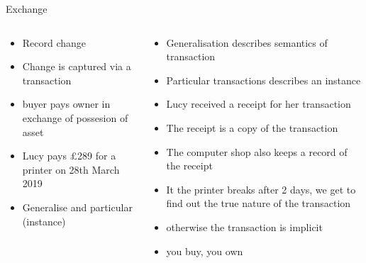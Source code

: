 \documentclass[pdf,table]{beamer}
\begin{document}
\begin{frame}{Exchange}
	\begin{columns}[T]
		\begin{column}{0.48\textwidth}
			\begin{itemize}
				\item Record change
				\item Change is captured via a transaction
				\item buyer pays owner in exchange of possesion of asset
				\item Lucy pays \pounds 289 for a printer on 28th March 2019
				\item Generalise and particular (instance)

			\end{itemize}
		\end{column}
		\begin{column}{0.48\textwidth}
			\begin{itemize}
				\item Generalisation describes semantics of transaction
				\item Particular transactions describes an instance
				\item Lucy received a receipt for her transaction
				\item The receipt is a copy of the transaction
				\item The computer shop also keeps a record of the receipt
				\item It the printer breaks after 2 days, we get to find out the true nature of the transaction
				\item otherwise the transaction is implicit
				\item you buy, you own
			\end{itemize}
		\end{column}
	\end{columns}	
\end{frame}
\end{document}
